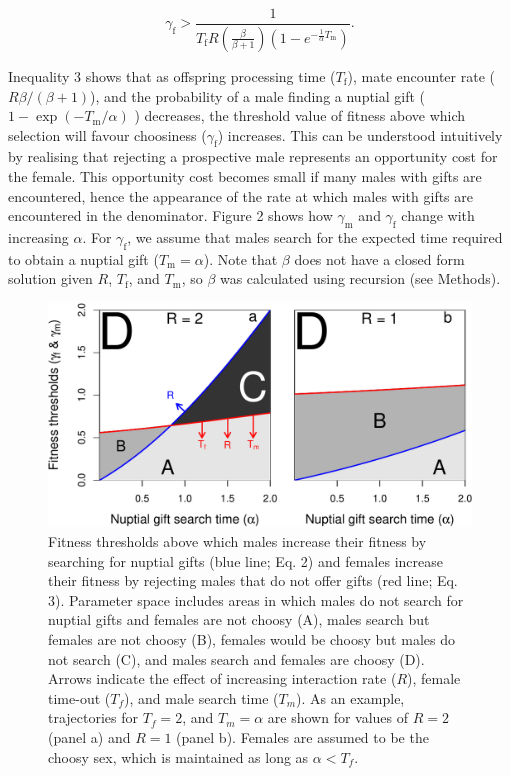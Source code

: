 \documentclass[
]{article}
\begin{document}
\begin{equation}
\gamma_{\mathrm{f}} > \frac{1}{T_{\mathrm{f}} R \left(\frac{\beta}{\beta + 1}\right) \left(1 - e^{-\frac{1}{\alpha}T_{\mathrm{m}}} \right)}.
\end{equation}

Inequality 3 shows that as offspring processing time
(\(T_{\mathrm{f}}\)), mate encounter rate (\(R\beta / (\beta + 1)\)),
and the probability of a male finding a nuptial gift
(\(1 - \exp(-T_{\mathrm{m}}/\alpha)\) ) decreases, the threshold value
of fitness above which selection will favour choosiness
(\(\gamma_{\mathrm{f}}\)) increases. This can be understood intuitively
by realising that rejecting a prospective male represents an opportunity
cost for the female. This opportunity cost becomes small if many males
with gifts are encountered, hence the appearance of the rate at which
males with gifts are encountered in the denominator. Figure 2 shows how
\(\gamma_{\mathrm{m}}\) and \(\gamma_{\mathrm{f}}\) change with
increasing \(\alpha\). For \(\gamma_{\mathrm{f}}\), we assume that males
search for the expected time required to obtain a nuptial gift
(\(T_{\mathrm{m}} = \alpha\)). Note that \(\beta\) does not have a
closed form solution given \(R\), \(T_{\mathrm{f}}\), and
\(T_{\mathrm{m}}\), so \(\beta\) was calculated using recursion (see
Methods).

\begin{figure}
\centering
\includegraphics{ms_refs_fixed_files/figure-latex/unnamed-chunk-3-1.pdf}
\caption{Fitness thresholds above which males increase their fitness by
searching for nuptial gifts (blue line; Eq. 2) and females increase
their fitness by rejecting males that do not offer gifts (red line; Eq.
3). Parameter space includes areas in which males do not search for
nuptial gifts and females are not choosy (A), males search but females
are not choosy (B), females would be choosy but males do not search (C),
and males search and females are choosy (D). Arrows indicate the effect
of increasing interaction rate (\(R\)), female time-out (\(T_{f}\)), and
male search time (\(T_{m}\)). As an example, trajectories for
\(T_{f} = 2\), and \(T_{m} = \alpha\) are shown for values of \(R=2\)
(panel a) and \(R = 1\) (panel b). Females are assumed to be the choosy
sex, which is maintained as long as \(\alpha < T_{f}\).}
\end{figure}
\end{document}
